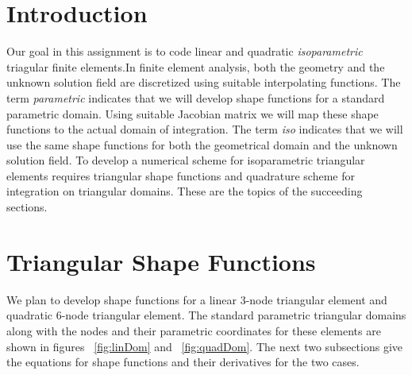 \documentclass[../main.tex]{subfiles}
\begin{document}
\lstset{language=Matlab}
\section{Introduction}
Our goal in this assignment is to code linear and quadratic
\textit{isoparametric} triagular finite elements.In finite element
analysis, both the geometry and the unknown solution field are
discretized using suitable interpolating functions. The term
\textit{parametric} indicates that we will develop shape functions for
a standard parametric domain. Using suitable Jacobian matrix we will
map these shape functions to the actual domain of integration. The
term \textit{iso} indicates that we will use the same shape functions
for both the geometrical domain and the unknown solution field. To
develop a numerical scheme for isoparametric triangular elements
requires triangular shape functions and quadrature scheme for
integration on triangular domains. These are the topics of the
succeeding sections.

\section{Triangular Shape Functions}
We plan to develop shape functions for a linear 3-node triangular
element and quadratic 6-node triangular element. The standard
parametric triangular domains along with the nodes and their
parametric coordinates for these elements are shown in figures
~\ref{fig:linDom} and ~\ref{fig:quadDom}. The next two subsections
give the equations for shape functions and their derivatives for the
two cases.
\end{document}
